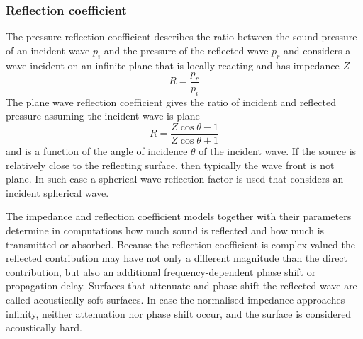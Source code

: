 \subsubsection*{Reflection coefficient}
The pressure reflection coefficient describes the ratio between the sound
pressure of an incident wave $p_i$ and the pressure of the reflected wave $p_r$
and considers a wave incident on an infinite plane that is locally
reacting and has impedance $Z$
\begin{equation}
  R = \frac{p_r}{p_i}
\end{equation}
The plane wave reflection coefficient gives the ratio of incident and reflected pressure assuming the incident wave is plane
\begin{equation}\label{eq:theory:sound:reflection:plane}
  R = \frac{Z\cos{\theta}-1}{Z\cos{\theta}+1}
\end{equation}
and is a function of the angle of incidence $\theta$ of the incident wave.
If the source is relatively close to the reflecting surface,
then typically the wave front is not plane. In such case a spherical wave
reflection factor is used that considers an incident spherical wave.

The impedance and reflection coefficient models together with their parameters
determine in computations how much sound is reflected and how much is
transmitted or absorbed. Because the reflection coefficient is complex-valued
the reflected contribution may have not only a different magnitude than the
direct contribution, but also an additional frequency-dependent phase shift or
propagation delay. Surfaces that attenuate and phase shift the reflected wave
are called acoustically soft surfaces. In case the normalised impedance
approaches infinity, neither attenuation nor phase shift occur, and the surface
is considered acoustically hard.



